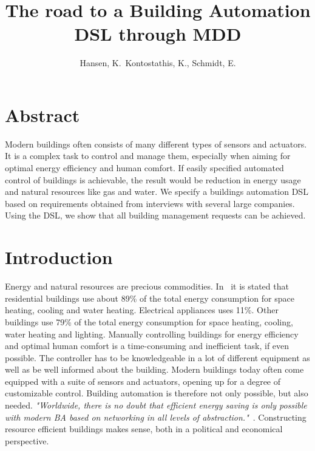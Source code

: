 \documentclass{llncs}
\begin{document}
\frontmatter
\pagestyle{headings}
\title{The road to a Building Automation DSL through MDD}
\author{Hansen, K.\, Kontostathis, K., Schmidt, E.}
\maketitle

\section{Abstract}
Modern buildings often consists of many different types of sensors and actuators. It is a complex task to control and manage them, especially when aiming for optimal energy efficiency and human comfort. If easily specified automated control of buildings is achievable, the result would be reduction in energy usage and natural resources like gas and water. We specify a buildings automation DSL based on requirements obtained from interviews with several large companies. Using the DSL, we show that all building management requests can be achieved.

\section{Introduction}
Energy and natural resources are precious commodities. In~\cite{janssen2004towards} it is stated that residential buildings use about 89\% of the total energy consumption for space heating, cooling and water heating. Electrical appliances uses 11\%. Other buildings use 79\% of the total energy consumption for space heating, cooling, water heating and lighting. Manually controlling buildings for energy efficiency and optimal human comfort is a time-consuming and inefficient task, if even possible. The controller has to be knowledgeable in a lot of different equipment as well as be well informed about the building. Modern buildings today often come equipped with a suite of sensors and actuators, opening up for a degree of customizable control. Building automation is therefore not only possible, but also needed. \textit{"Worldwide, there is no doubt that efficient energy saving is only possible with modern BA based on networking in all levels of abstraction."}~\cite{dietrich2010communication}. Constructing resource efficient buildings makes sense, both in a political and economical perspective. 
\end{document}
